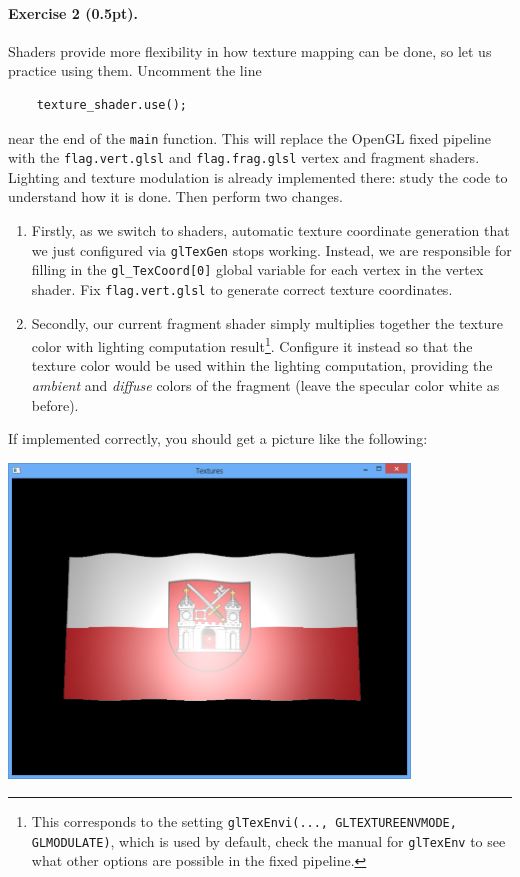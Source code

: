 \documentclass{article}
\newenvironment{exercise}[2]{\paragraph{Exercise #1 (#2pt).} }{
\medskip}
\begin{document}
\begin{exercise}{2}{0.5}
Shaders provide more flexibility in how texture mapping can be done, so let us practice using them. Uncomment the line 
\begin{verbatim}
    texture_shader.use();
\end{verbatim}
near the end of the \texttt{main} function. This will replace the OpenGL fixed pipeline with the \texttt{flag.vert.glsl} and \texttt{flag.frag.glsl} vertex and fragment shaders. Lighting and texture modulation is already implemented there: study the code to understand how it is done. Then perform two changes.
\begin{enumerate}
\item Firstly, as we switch to shaders, automatic texture coordinate generation that we just configured via \texttt{glTexGen} stops working. Instead, we are responsible for filling in the \verb#gl_TexCoord[0]# global variable for each vertex in the vertex shader. Fix \texttt{flag.vert.glsl} to generate correct texture coordinates.
\item Secondly, our current fragment shader simply multiplies together the texture color with lighting computation result\footnote{This corresponds to the setting \texttt{glTexEnvi(..., GL\textunderscore TEXTURE\textunderscore ENV\textunderscore MODE, GL\textunderscore MODULATE)}, which is used by default, check the manual for \texttt{glTexEnv} to see what other options are possible in the fixed pipeline.}. Configure it instead so that the texture color would be used within the lighting computation, providing the \emph{ambient} and \emph{diffuse} colors of the fragment (leave the specular color white as before).
\end{enumerate}

If implemented correctly, you should get a picture like the following:
\begin{center}
\includegraphics[width=0.8\textwidth]{flag.png}
\end{center}


\end{exercise}
\end{document}
